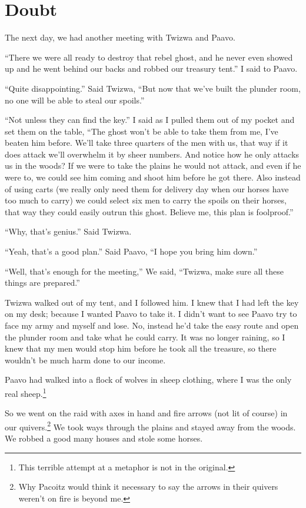 \chapter{Doubt}

The next day, we had another meeting with Twizwa and Paavo.

``There we were all ready to destroy that rebel ghost, and he never even showed up and he went behind our backs and robbed our treasury tent.'' I said to Paavo.

``Quite disappointing.'' Said Twizwa, ``But now that we've built the plunder room, no one will be able to steal our spoils.''

``Not unless they can find the key.'' I said as I pulled them out of my pocket and set them on the table, ``The ghost won't be able to take them from me, I've beaten him before. We'll take three quarters of the men with us, that way if it does attack we'll overwhelm it by sheer numbers. And notice how he only attacks us in the woods? If we were to take the plains he would not attack, and even if he were to, we could see him coming and shoot him before he got there. Also instead of using carts (we really only need them for delivery day when our horses have too much to carry) we could select six men to carry the spoils on their horses, that way they could easily outrun this ghost. Believe me, this plan is foolproof.''

``Why, that's genius.'' Said Twizwa.

``Yeah, that's a good plan.'' Said Paavo, ``I hope you bring him down.''

``Well, that's enough for the meeting,'' We said, ``Twizwa, make sure all these things are prepared.''

Twizwa walked out of my tent, and I followed him. I knew that I had left the key on my desk; because I wanted Paavo to take it. I didn't want to see Paavo try to face my army and myself and lose. No, instead he'd take the easy route and open the plunder room and take what he could carry. It was no longer raining, so I knew that my men would stop him before he took all the treasure, so there wouldn't be much harm done to our income.

Paavo had walked into a flock of wolves in sheep clothing, where I was the only real sheep.\footnote{This terrible attempt at a metaphor is not in the original.} 

So we went on the raid with axes in hand and fire arrows (not lit of course) in our quivers.\footnote{Why Pacoitz would think it necessary to say the arrows in their quivers weren't on fire is beyond me.} We took ways through the plains and stayed away from the woods. We robbed a good many houses and stole some horses.

